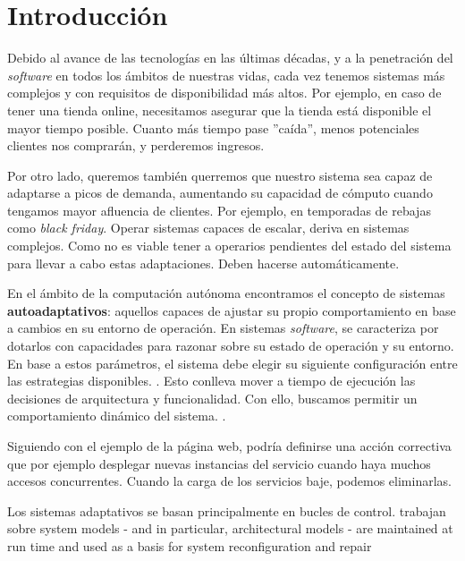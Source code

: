 
\chapter{Introducción}
\label{chap:introduccion}

Debido al avance de las tecnologías en las últimas décadas, y a la penetración del \emph{software} en todos los ámbitos de nuestras vidas, cada vez tenemos sistemas más complejos y con requisitos de disponibilidad más altos. Por ejemplo, en caso de tener una tienda online, necesitamos asegurar que la tienda está disponible el mayor tiempo posible. Cuanto más tiempo pase ''caída'', menos potenciales clientes nos comprarán, y perderemos ingresos.

Por otro lado, queremos también querremos que nuestro sistema sea capaz de adaptarse a picos de demanda, aumentando su capacidad de cómputo cuando tengamos mayor afluencia de clientes. Por ejemplo, en temporadas de rebajas como \emph{black friday}. Operar sistemas capaces de escalar, deriva en sistemas complejos. Como no es viable tener a operarios pendientes del estado del sistema para llevar a cabo estas adaptaciones. Deben hacerse automáticamente.

En el ámbito de la computación autónoma encontramos el concepto de sistemas \textbf{autoadaptativos}: aquellos capaces de ajustar su propio comportamiento en base a cambios en su entorno de operación. En sistemas \emph{software}, se caracteriza por dotarlos con capacidades para razonar sobre su estado de operación y su entorno. En base a estos parámetros, el sistema debe elegir su siguiente configuración entre las estrategias disponibles. \cite{garlanIncreasingSystemDependability2003}. Esto conlleva mover a tiempo de ejecución las decisiones de arquitectura y funcionalidad. Con ello, buscamos permitir un comportamiento dinámico del sistema. \cite{brunEngineeringSelfAdaptiveSystems2009}.

Siguiendo con el ejemplo de la página web, podría definirse una acción correctiva que por ejemplo desplegar nuevas instancias del servicio cuando haya muchos accesos concurrentes. Cuando la carga de los servicios baje, podemos eliminarlas.

Los sistemas adaptativos se basan principalmente en bucles de control. trabajan sobre system models - and in particular, architectural models - are maintained at run time
and used as a basis for system reconfiguration and repair \cite{garlanIncreasingSystemDependability2003}

